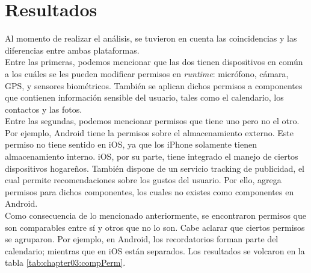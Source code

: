 \section*{Resultados}
Al momento de realizar el análisis, se tuvieron en cuenta las coincidencias y las diferencias entre ambas plataformas.\\
Entre las primeras, podemos mencionar que las dos tienen dispositivos en común a los cuáles se les pueden modificar permisos en \textit{runtime}: micrófono, cámara, GPS, y sensores biométricos. También se aplican dichos permisos a componentes que contienen información sensible del usuario, tales como el calendario, los contactos y las fotos.\\
Entre las segundas, podemos mencionar permisos que tiene uno pero no el otro. Por ejemplo, Android tiene la permisos sobre el almacenamiento externo. Este permiso no tiene sentido en iOS, ya que los iPhone solamente tienen almacenamiento interno. iOS, por su parte, tiene integrado el manejo de ciertos dispositivos hogareños. También dispone de un servicio tracking de publicidad, el cual permite recomendaciones sobre los gustos del usuario. Por ello, agrega permisos para dichos componentes, los cuales no existes como componentes en Android.\\
Como consecuencia de lo mencionado anteriormente, se encontraron permisos que son comparables entre sí y otros que no lo son. Cabe aclarar que ciertos permisos se agruparon. Por ejemplo, en Android, los recordatorios forman parte del calendario; mientras que en iOS están separados. Los resultados se volcaron en la tabla \ref{tab:chapter03:compPerm}.\\

